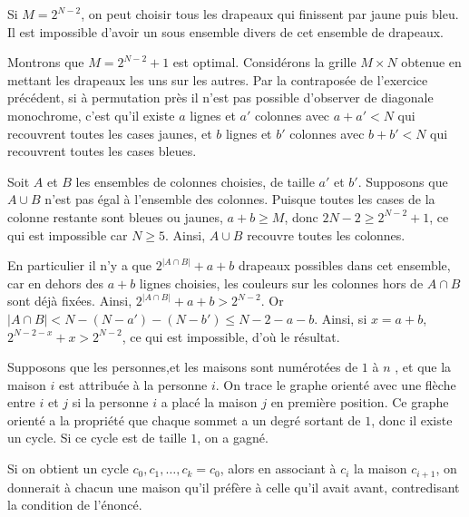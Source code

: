 \begin{sol}
Si $M = 2^{N - 2}$, on peut choisir tous les drapeaux qui finissent par jaune puis bleu. Il est impossible d'avoir un sous ensemble divers de cet ensemble de drapeaux.

\medskip

Montrons que $M = 2^{N - 2} + 1$ est optimal. Considérons la grille $M \times N$ obtenue en mettant les drapeaux les uns sur les autres. Par la contraposée de l'exercice précédent, si à permutation près il n'est pas possible d'observer de diagonale monochrome, c'est qu'il existe $a$ lignes et $a'$ colonnes avec $a + a' < N$ qui recouvrent toutes les cases jaunes, et $b$ lignes et $b'$ colonnes avec $b + b' < N$ qui recouvrent toutes les cases bleues.

\medskip

Soit $A$ et $B$ les ensembles de colonnes choisies, de taille $a'$ et $b'$. Supposons que $A\cup B$ n'est pas égal à l'ensemble des colonnes. Puisque toutes les cases de la colonne restante sont bleues ou jaunes, $a + b \ge M$, donc $2N - 2 \ge 2^{N - 2} + 1$, ce qui est impossible car $N \ge 5$. Ainsi, $A\cup B$ recouvre toutes les colonnes.

\medskip

En particulier il n'y a que $2^{|A \cap B|} + a + b$ drapeaux possibles dans cet ensemble, car en dehors des $a + b$ lignes choisies, les couleurs sur les colonnes hors de $A \cap B$ sont déjà fixées. Ainsi, $2^{|A \cap B|} + a + b > 2^{N - 2}$. Or $|A \cap B| < N - (N - a') - (N - b') \le N - 2 - a - b$. Ainsi, si $x = a + b$, $2^{N - 2 - x} + x > 2^{N - 2}$, ce qui est impossible, d'où le résultat.
\end{sol}


\begin{sol}
Supposons que les personnes,et les maisons sont numérotées de $1$ à $n$ , et que la maison $i$ est attribuée à la personne $i$. On trace le graphe orienté avec une flèche entre $i$ et $j$ si la personne $i$ a placé la maison $j$ en première position. Ce graphe orienté a la propriété que chaque sommet a un degré sortant de $1$, donc il existe un cycle. Si ce cycle est de taille $1$, on a gagné.

\medskip

Si on obtient un cycle $c_0, c_1, \dots, c_k = c_0$, alors en associant à $c_i$ la maison $c_{i + 1}$, on donnerait à chacun une maison qu'il préfère à celle qu'il avait avant, contredisant la condition de l'énoncé.
\end{sol}


